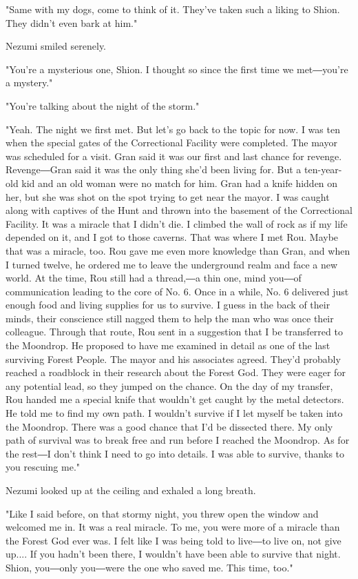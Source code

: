 "Same with my dogs, come to think of it. They've taken such a liking to
Shion. They didn't even bark at him."

Nezumi smiled serenely.

"You're a mysterious one, Shion. I thought so since the first time we
met―you're a mystery."

"You're talking about the night of the storm."

"Yeah. The night we first met. But let's go back to the topic for now. I
was ten when the special gates of the Correctional Facility were
completed. The mayor was scheduled for a visit. Gran said it was our
first and last chance for revenge. Revenge―Gran said it was the only
thing she'd been living for. But a ten-year-old kid and an old woman
were no match for him. Gran had a knife hidden on her, but she was shot
on the spot trying to get near the mayor. I was caught along with
captives of the Hunt and thrown into the basement of the Correctional
Facility. It was a miracle that I didn't die. I climbed the wall of rock
as if my life depended on it, and I got to those caverns. That was where
I met Rou. Maybe that was a miracle, too. Rou gave me even more
knowledge than Gran, and when I turned twelve, he ordered me to leave
the underground realm and face a new world. At the time, Rou still had a
thread,―a thin one, mind you―of communication leading to the core of No.
6. Once in a while, No. 6 delivered just enough food and living supplies
for us to survive. I guess in the back of their minds, their conscience
still nagged them to help the man who was once their colleague. Through
that route, Rou sent in a suggestion that I be transferred to the
Moondrop. He proposed to have me examined in detail as one of the last
surviving Forest People. The mayor and his associates agreed. They'd
probably reached a roadblock in their research about the Forest God.
They were eager for any potential lead, so they jumped on the chance. On
the day of my transfer, Rou handed me a special knife that wouldn't get
caught by the metal detectors. He told me to find my own path. I
wouldn't survive if I let myself be taken into the Moondrop. There was a
good chance that I'd be dissected there. My only path of survival was to
break free and run before I reached the Moondrop. As for the rest―I
don't think I need to go into details. I was able to survive, thanks to
you rescuing me."

Nezumi looked up at the ceiling and exhaled a long breath.

"Like I said before, on that stormy night, you threw open the window and
welcomed me in. It was a real miracle. To me, you were more of a miracle
than the Forest God ever was. I felt like I was being told to live―to
live on, not give up.... If you hadn't been there, I wouldn't have been
able to survive that night. Shion, you―only you―were the one who saved
me. This time, too."

